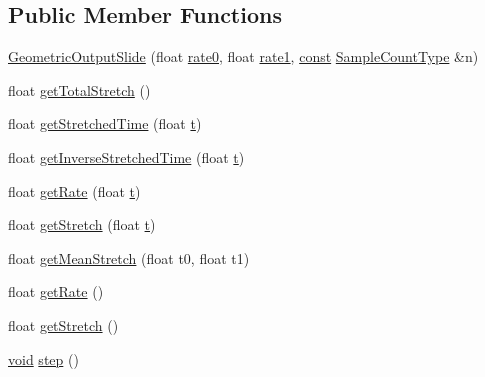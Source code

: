 \subsection*{Public Member Functions}
\begin{DoxyCompactItemize}
\item 
\hyperlink{class__sbsms___1_1_geometric_output_slide_a3118d422b66e942e8817178f8361d726}{Geometric\+Output\+Slide} (float \hyperlink{class__sbsms___1_1_geometric_output_slide_a6da61d1b515f8e37b52bc51e998b22c7}{rate0}, float \hyperlink{class__sbsms___1_1_geometric_output_slide_a1a85935424121378a7c9efac96ab1f43}{rate1}, \hyperlink{getopt1_8c_a2c212835823e3c54a8ab6d95c652660e}{const} \hyperlink{namespace__sbsms___ae4ba47977e7e07f5945e529e2256b662}{Sample\+Count\+Type} \&n)
\item 
float \hyperlink{class__sbsms___1_1_geometric_output_slide_a16cffbb5db0404fef70f251feeab2aa3}{get\+Total\+Stretch} ()
\item 
float \hyperlink{class__sbsms___1_1_geometric_output_slide_aa8dff34eab971e4613b1268741fa634c}{get\+Stretched\+Time} (float \hyperlink{octave__test_8m_aaccc9105df5383111407fd5b41255e23}{t})
\item 
float \hyperlink{class__sbsms___1_1_geometric_output_slide_a2e1fa9507e413ba7682b522a24af8076}{get\+Inverse\+Stretched\+Time} (float \hyperlink{octave__test_8m_aaccc9105df5383111407fd5b41255e23}{t})
\item 
float \hyperlink{class__sbsms___1_1_geometric_output_slide_a23b63e84f3b182a9737ef26e4c701295}{get\+Rate} (float \hyperlink{octave__test_8m_aaccc9105df5383111407fd5b41255e23}{t})
\item 
float \hyperlink{class__sbsms___1_1_geometric_output_slide_aca976de5ea102fee84e8fdb557fceae2}{get\+Stretch} (float \hyperlink{octave__test_8m_aaccc9105df5383111407fd5b41255e23}{t})
\item 
float \hyperlink{class__sbsms___1_1_geometric_output_slide_a4fc2b72a98e8a28a2c4237dfb4c1f178}{get\+Mean\+Stretch} (float t0, float t1)
\item 
float \hyperlink{class__sbsms___1_1_geometric_output_slide_a31ae709cc0088390aafeab7925147002}{get\+Rate} ()
\item 
float \hyperlink{class__sbsms___1_1_geometric_output_slide_aaef47295fd7347c1bb9ff20d46007041}{get\+Stretch} ()
\item 
\hyperlink{sound_8c_ae35f5844602719cf66324f4de2a658b3}{void} \hyperlink{class__sbsms___1_1_geometric_output_slide_a26c42956c7a3d89e16b57da4457cfaa4}{step} ()
\end{DoxyCompactItemize}
